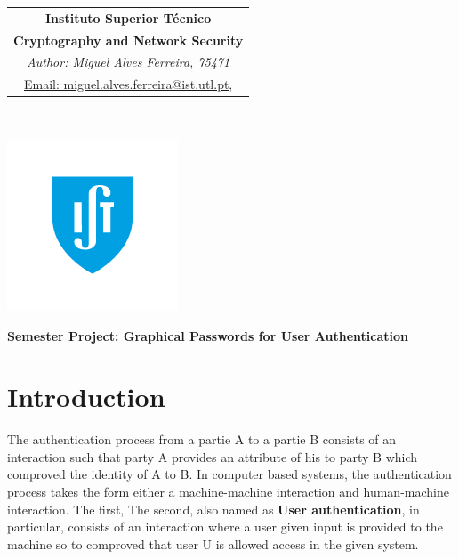 \documentclass[11pt,a4paper]{article}
\theoremstyle{defn, nobreak=true}
\begin{document}
%
\vspace{-2cm}
\begin{table}[h]
\begin{minipage}{0.65\textwidth}
\centering
\begin{tabular}{c}
\large\textbf{Instituto Superior T\'ecnico}\\
\large\textbf{Cryptography and Network Security} \\
\large\textit{Author: Miguel Alves Ferreira, 75471} \\
\large\underline{Email: miguel.alves.ferreira@ist.utl.pt}, \\
\end{tabular}
\label{tab:tab1}
\end{minipage}
~\hfill~
\begin{minipage}{0.35\textwidth}
\centering
\includegraphics[scale=0.5]{logo_IST}
\end{minipage}
\end{table}
\vspace{-5mm}
\begin{center}
\large\textbf{Semester Project: Graphical Passwords for User Authentication}
\end{center}

\section{Introduction} \label{sec:intro}

The authentication process from a partie A to a partie B consists of an interaction such that party A provides an attribute of his to party B which comproved the identity of A to B. In computer based systems, the authentication process takes the form either a machine-machine interaction and human-machine interaction. The first,  The second, also named as \textbf{User authentication}, in particular, consists of an interaction where a user given input is provided to the machine so to comproved that user U is allowed access in the given system. 
\end{document}
